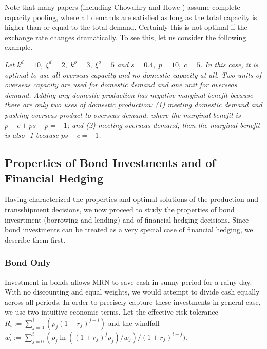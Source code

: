\documentclass[mnsc,nonblindrev,copyedit]{informs2_wz} %
\begin{document}
Note that many papers (including Chowdhry and Howe \cite{Chowdhry1999}) assume complete capacity pooling, where all demands are satisfied as long as the total capacity is higher than or equal to the total demand.  Certainly this is not optimal if the exchange rate changes dramatically.  To see this, let us consider the following example.

\medskip


 {\em Let $k^d = 10,\; \xi^d = 2, \; k^o = 3,\; \xi^o = 5 $ and $s = 0.4, \; p = 10,\; c = 5$.  In this case, it is optimal to use all overseas capacity and no domestic capacity at all.  Two units of overseas capacity are used for domestic demand and one unit for overseas demand.  Adding any domestic production has negative marginal benefit because there are only two uses of domestic production: (1) meeting domestic demand and pushing overseas product to overseas demand, where the marginal benefit is $p-c + ps - p = -1$; and (2) meeting overseas demand; then the marginal benefit is also -1 because $ ps - c = -1$.}




\subsection{Properties of Bond Investments and of Financial Hedging}

Having characterized the properties and optimal solutions of the production and transshipment decisions, we now proceed to study the properties of bond invesrtment (borrowing and lending) and of financial hedging decisions.  Since bond investments can be treated as a very special case of financial hedging, we describe them first.





\subsubsection{Bond Only}

Investment in bonds allows MRN to save cash in sunny period for a rainy day.  With no discounting and equal weights, we would attempt to divide cash equally across all periods.  In order to precisely capture these investments in general case, we use two intuitive economic terms.  Let the effective risk tolerance $R_i :=\sum_{j=0}^i (\rho_j(1+r_f)^{j-i})$ and the  windfall $w^\prime_i := \sum_{j=0}^i(\rho_j \ln((1+r_f)^j \rho_j)/w_j)/(1+r_f)^{i-j})$.
\end{document}
